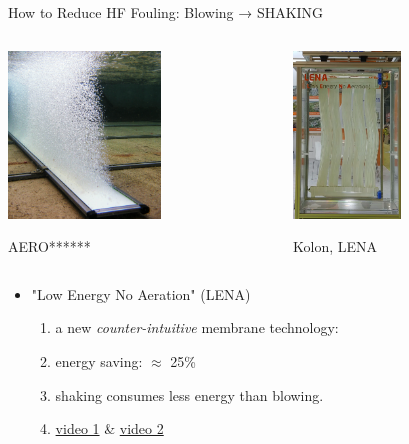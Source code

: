 \documentclass[t,presentation]{beamer}
\begin{document}
\begin{frame}[label={sec:org3fde085}]{How to Reduce HF Fouling:  Blowing → SHAKING}
\vspace{0.25cm}
\begin{columns}[C]
\begin{column}{.45\textwidth}
\centering
\includegraphics[height=1.75in]{figures/airdiffuser2.jpg}
\par
AERO******
\end{column}
\begin{column}{.45\textwidth} %
\centering
\includegraphics[height=1.75in]{figures/LENA-img_2018_04_29_18_45.png}
\par Kolon, LENA
\end{column}
\end{columns}
\begin{itemize}
\item "\alert{Low Energy No Aeration}" (LENA)
\begin{enumerate}
\item a new  \emph{counter-intuitive} membrane technology:
\item energy saving: \(\approx\) 25\%
\item shaking consumes less energy than blowing.
\item \href{https://drive.google.com/file/d/1biSZK0caHFg7mzu3PPcHoZ9\_O4z7kR4d/view?usp=sharing}{video 1} \& \href{https://drive.google.com/file/d/1qSkZDnRfBLKfTKIlvScXDiLdXoNnRZLH/view?usp=sharing}{video 2}
\end{enumerate}
\end{itemize}
\end{frame}
\end{document}
